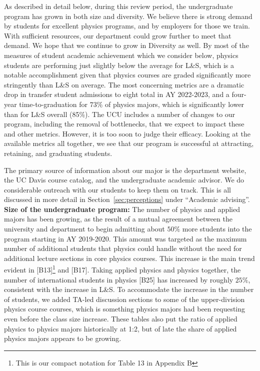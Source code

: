 \documentclass[12pt]{article}
\begin{document}
\noindent
As described in detail below, during this review period, the
undergraduate program has grown in both size and diversity.  We
believe there is strong demand by students for excellent physics
programs, and by employers for those we train.  With sufficient
resources, our department could grow further to meet that demand.  We
hope that we continue to grow in Diversity as well.  By most of the
measures of student academic achievement which we consider below,
physics students are performing just slightly below the average for
L\&S, which is a notable accomplishment given that physics courses are
graded significantly more stringently than L\&S on average.  The most
concerning metrics are a dramatic drop in transfer student admissions
to eight total in AY 2022-2023, and a four-year time-to-graduation for
$73\%$ of physics majors, which is significantly lower than for L\&S
overall (85\%).  The UCU includes a number of changes to our program,
including the removal of bottlenecks, that we expect to impact these
and other metrics.  However, it is too soon to judge their efficacy.
Looking at the available metrics all together, we see that our program
is successful at attracting, retaining, and graduating students.

The primary source of information about our major is the department
website, the UC Davis course catalog, and the undergraduate academic
advisor.  We do considerable outreach with our students to keep them
on track.  This is all discussed in more detail in
Section~\ref{sec:perceptions} under ``Academic advising''.\\[3pt]

\noindent
{\bf Size of the undergraduate program:} The number of physics and
applied majors has been growing, as the result of a mutual agreement
between the university and department to begin admitting about $50\%$
more students into the program starting in AY 2019-2020.  This amount
was targeted as the maximum number of additional students that physics
could handle without the need for additional lecture sections in core
physics courses.  This increase is the main trend evident in 
[B13]\footnote{This is our compact notation for Table 13 in Appendix B}
and [B17]. Taking applied physics and physics together, the number of
international students in physics [B25] has increased by roughly
$25\%$, consistent with the increase in L\&S.  To accommodate the
increase in the number of students, we added TA-led discussion
sections to some of the upper-division physics course courses, which
is something physics majors had been requesting even before the class
size increase.  These tables also put the ratio of applied physics to
physics majors historically at 1:2, but of late the share of applied
physics majors appears to be growing.\\[3pt]
\end{document}
